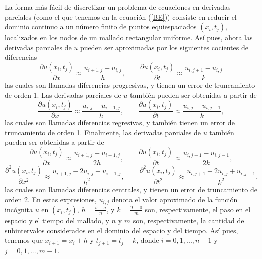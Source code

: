 La forma más fácil de discretizar un problema de ecuaciones en derivadas parciales (como el que tenemos en la ecuación (\ref{BE})) consiste en reducir el dominio continuo a un número finito de puntos equiespaciados $(x_i,t_j)$, localizados en los nodos de un mallado rectangular uniforme. Así pues, ahora las derivadas parciales de $u$ pueden ser aproximadas por los siguientes cocientes de diferencias 
\begin{equation} \label{forward}
\frac{\partial u(x_i,t_j)}{\partial x}\approx\frac{u_{i+1,j}-u_{i,j}}{h}, \qquad\frac{\partial u(x_i,t_j)}{\partial t}\approx\frac{u_{i,j+1}-u_{i,j}}{k}
\end{equation}
las cuales son llamadas diferencias progresivas, y tienen un error de truncamiento de orden 1. Las derivadas parciales de $u$ también pueden ser obtenidas a partir de
\begin{equation} \label{backward}
\frac{\partial u(x_i,t_j)}{\partial x}\approx\frac{u_{i,j}-u_{i-1,j}}{h}, \qquad\frac{\partial u(x_i,t_j)}{\partial t}\approx\frac{u_{i,j}-u_{i,j-1}}{k},
\end{equation}
las cuales son llamadas diferencias regresivas, y también tienen un error de truncamiento de orden 1. Finalmente, las derivadas parciales de $u$ también pueden ser obtenidas a partir de
\begin{equation} \label{central}
\frac{\partial u(x_i,t_j)}{\partial x}\approx\frac{u_{i+1,j}-u_{i-1,j}}{2h}, \qquad\frac{\partial u(x_i,t_j)}{\partial t}\approx\frac{u_{i,j+1}-u_{i,j-1}}{2k},
\end{equation}
\begin{equation} \label{centralsecond}
\frac{\partial^2 u(x_i,t_j)}{\partial x^2}\approx\frac{u_{i+1,j}-2u_{i,j}+u_{i-1,j}}{h^2}, \qquad\frac{\partial^2 u(x_i,t_j)}{\partial t^2}\approx\frac{u_{i,j+1}-2u_{i,j}+u_{i,j-1}}{k^2},
\end{equation}
las cuales son llamadas diferencias centrales, y tienen un error de truncamiento de orden 2. En estas expresiones, $u_{i,j}$ denota el valor aproximado de la función incógnita $u$ en $(x_i,t_j)$, $h=\frac{b-a}{n}$, y $k=\frac{T-0}{m}$ son, respectivamente, el paso en el espacio y el tiempo del mallado, y $n$ y $m$ son, respectivamente, la cantidad de subintervalos considerados en el dominio del espacio y del tiempo. Así pues, tenemos que $x_{i+1}=x_i+h$ y $t_{j+1}=t_j+k$, donde $i=0,1,...,n-1$ y
$j=0,1,...,m-1$.

